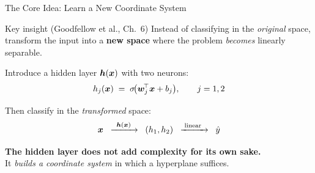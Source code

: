 \documentclass[11pt,aspectratio=169,professionalfonts]{beamer}
\begin{document}
\begin{frame}{The Core Idea: Learn a New Coordinate System}

\begin{block}{Key insight (Goodfellow et al., Ch.~6)}
Instead of classifying in the \emph{original} space, transform the
input into a \textbf{new space} where the problem \emph{becomes}
linearly separable.
\end{block}

\vspace{0.2cm}
Introduce a \alert{hidden layer} $\bm{h}(\bm{x})$ with two neurons:
\[
  h_j(\bm{x}) \;=\; \sigma\!\bigl(\bm{w}_j^{\!\top}\bm{x} + b_j\bigr),
  \qquad j = 1, 2
\]

Then classify in the \emph{transformed} space:
\[
  \bm{x} \;\;\xrightarrow{\;\;\bm{h}(\bm{x})\;\;}\;\;
  (h_1, h_2) \;\;\xrightarrow{\;\text{linear}\;\;}\;\; \hat{y}
\]

\vspace{0.2cm}
\textbf{The hidden layer does not add complexity for its own sake.}\\
It \emph{builds a coordinate system} in which a hyperplane suffices.

\end{frame}
%
%
\end{document}
